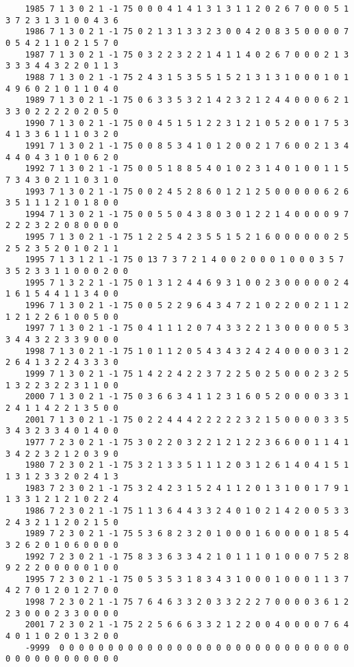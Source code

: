 \begin{landscape}
{\begin{verbatim}
	1985 7 1 3 0 2 1 -1 75 0 0 0 4 1 4 1 3 1 3 1 1 2 0 2 6 7 0 0 0 5 1 3 7 2 3 1 3 1 0 0 4 3 6
	1986 7 1 3 0 2 1 -1 75 0 2 1 3 1 3 3 2 3 0 0 4 2 0 8 3 5 0 0 0 0 7 0 5 4 2 1 1 0 2 1 5 7 0
	1987 7 1 3 0 2 1 -1 75 0 3 2 2 3 2 2 1 4 1 1 4 0 2 6 7 0 0 0 2 1 3 3 3 3 4 4 3 2 2 0 1 1 3
	1988 7 1 3 0 2 1 -1 75 2 4 3 1 5 3 5 5 1 5 2 1 3 1 3 1 0 0 0 1 0 1 4 9 6 0 2 1 0 1 1 0 4 0
	1989 7 1 3 0 2 1 -1 75 0 6 3 3 5 3 2 1 4 2 3 2 1 2 4 4 0 0 0 6 2 1 3 3 0 2 2 2 2 0 2 0 5 0
	1990 7 1 3 0 2 1 -1 75 0 0 4 5 1 5 1 2 2 3 1 2 1 0 5 2 0 0 1 7 5 3 4 1 3 3 6 1 1 1 0 3 2 0
	1991 7 1 3 0 2 1 -1 75 0 0 8 5 3 4 1 0 1 2 0 0 2 1 7 6 0 0 2 1 3 4 4 4 0 4 3 1 0 1 0 6 2 0
	1992 7 1 3 0 2 1 -1 75 0 0 5 1 8 8 5 4 0 1 0 2 3 1 4 0 1 0 0 1 1 5 7 3 4 3 0 2 1 1 0 3 1 0
	1993 7 1 3 0 2 1 -1 75 0 0 2 4 5 2 8 6 0 1 2 1 2 5 0 0 0 0 0 6 2 6 3 5 1 1 1 2 1 0 1 8 0 0
	1994 7 1 3 0 2 1 -1 75 0 0 5 5 0 4 3 8 0 3 0 1 2 2 1 4 0 0 0 0 9 7 2 2 2 3 2 2 0 8 0 0 0 0
	1995 7 1 3 0 2 1 -1 75 1 2 2 5 4 2 3 5 5 1 5 2 1 6 0 0 0 0 0 0 2 5 2 5 2 3 5 2 0 1 0 2 1 1
	1995 7 1 3 1 2 1 -1 75 0 13 7 3 7 2 1 4 0 0 2 0 0 0 1 0 0 0 3 5 7 3 5 2 3 3 1 1 0 0 0 2 0 0
	1995 7 1 3 2 2 1 -1 75 0 1 3 1 2 4 4 6 9 3 1 0 0 2 3 0 0 0 0 0 2 4 1 6 1 5 4 4 1 1 3 4 0 0
	1996 7 1 3 0 2 1 -1 75 0 0 5 2 2 9 6 4 3 4 7 2 1 0 2 2 0 0 2 1 1 2 1 2 1 2 2 6 1 0 0 5 0 0
	1997 7 1 3 0 2 1 -1 75 0 4 1 1 1 2 0 7 4 3 3 2 2 1 3 0 0 0 0 0 5 3 3 4 4 3 2 2 3 3 9 0 0 0
	1998 7 1 3 0 2 1 -1 75 1 0 1 1 2 0 5 4 3 4 3 2 4 2 4 0 0 0 0 3 1 2 2 6 4 1 3 2 2 4 3 3 3 0
	1999 7 1 3 0 2 1 -1 75 1 4 2 2 4 2 2 3 7 2 2 5 0 2 5 0 0 0 2 3 2 5 1 3 2 2 3 2 2 3 1 1 0 0
	2000 7 1 3 0 2 1 -1 75 0 3 6 6 3 4 1 1 2 3 1 6 0 5 2 0 0 0 0 3 3 1 2 4 1 1 4 2 2 1 3 5 0 0
	2001 7 1 3 0 2 1 -1 75 0 2 2 4 4 4 2 2 2 2 2 3 2 1 5 0 0 0 0 3 3 5 3 4 3 2 3 3 4 0 1 4 0 0
	1977 7 2 3 0 2 1 -1 75 3 0 2 2 0 3 2 2 1 2 1 2 2 3 6 6 0 0 1 1 4 1 3 4 2 2 3 2 1 2 0 3 9 0
	1980 7 2 3 0 2 1 -1 75 3 2 1 3 3 5 1 1 1 2 0 3 1 2 6 1 4 0 4 1 5 1 1 3 1 2 3 3 2 0 2 4 1 3
	1983 7 2 3 0 2 1 -1 75 3 2 4 2 3 1 5 2 4 1 1 2 0 1 3 1 0 0 1 7 9 1 1 3 3 1 2 1 2 1 0 2 2 4
	1986 7 2 3 0 2 1 -1 75 1 1 3 6 4 4 3 3 2 4 0 1 0 2 1 4 2 0 0 5 3 3 2 4 3 2 1 1 2 0 2 1 5 0
	1989 7 2 3 0 2 1 -1 75 5 3 6 8 2 3 2 0 1 0 0 0 1 6 0 0 0 0 1 8 5 4 3 2 6 2 0 1 0 6 0 0 0 0
	1992 7 2 3 0 2 1 -1 75 8 3 3 6 3 3 4 2 1 0 1 1 1 0 1 0 0 0 7 5 2 8 9 2 2 2 0 0 0 0 0 1 0 0
	1995 7 2 3 0 2 1 -1 75 0 5 3 5 3 1 8 3 4 3 1 0 0 0 1 0 0 0 1 1 3 7 4 2 7 0 1 2 0 1 2 7 0 0
	1998 7 2 3 0 2 1 -1 75 7 6 4 6 3 3 2 0 3 3 2 2 2 7 0 0 0 0 3 6 1 2 2 3 0 0 0 2 3 3 0 0 0 0
	2001 7 2 3 0 2 1 -1 75 2 2 5 6 6 6 3 3 2 1 2 2 0 0 4 0 0 0 0 7 6 4 4 0 1 1 0 2 0 1 3 2 0 0
	-9999  0 0 0 0 0 0 0 0 0 0 0 0 0 0 0 0 0 0 0 0 0 0 0 0 0 0 0 0 0 0 0 0 0 0 0 0 0 0 0 0 0 0

\end{verbatim}}
\end{landscape}

